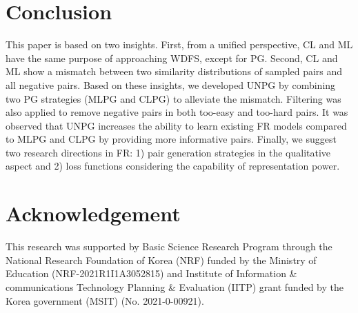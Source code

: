 \documentclass[10pt,twocolumn]{article}
\begin{document}
\section{Conclusion}
This paper is based on two insights. First, from a unified perspective, CL and ML have the same purpose of approaching WDFS, except for PG. Second, CL and ML show a mismatch between two similarity distributions of sampled pairs and all negative pairs. Based on these insights, we developed UNPG by combining two PG strategies (MLPG and CLPG) to alleviate the mismatch. Filtering was also applied to remove negative pairs in both too-easy and too-hard pairs. It was observed that UNPG increases the ability to learn existing FR models compared to MLPG and CLPG by providing more informative pairs. Finally, we suggest two research directions in FR: 1) pair generation strategies in the qualitative aspect and 2) loss functions considering the capability of representation power.

\section{Acknowledgement}
This research was supported by Basic Science Research Program through the National Research Foundation of Korea (NRF) funded by the Ministry of Education (NRF-2021R1I1A3052815) and Institute of Information \& communications Technology Planning \& Evaluation (IITP) grant funded by the Korea government (MSIT) (No. 2021-0-00921).



\end{document}
